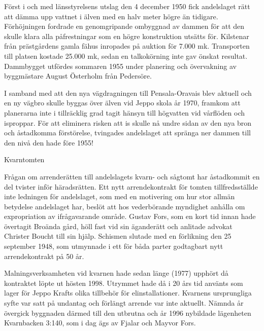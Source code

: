 Först i och med länsstyrelsens utslag den 4 december 1950 fick andelslaget rätt att dämma upp vattnet i älven med en halv meter högre än tidigare. Förhöjningen fordrade en genomgripande ombyggnad av dammen för att den skulle klara alla påfrestningar som en högre konstruktion utsätts för. Kilstenar från prästgårdens gamla fähus inropades på auktion för 7.000 mk. Transporten till platsen kostade 25.000 mk, sedan en talkokörning inte gav önskat resultat. Dammbygget utfördes sommaren 1955 under planering och övervakning av byggmästare August Österholm från Pedersöre.

I samband med att den nya vägdragningen till Pensala-Oravais blev aktuell och en ny vägbro skulle byggas över älven vid Jeppo skola år 1970,  framkom att planerarna inte i tillräcklig grad tagit hänsyn till högvatten vid vårflöden och isproppar. För att eliminera risken att is skulle nå undre sidan av den nya bron och åstadkomma förstörelse, tvingades andelslaget att spränga ner dammen till den nivå den hade före 1955!


Kvarntomten

Frågan om arrenderätten till andelslagets kvarn- och sågtomt har åstadkommit en del tvister inför häradsrätten. Ett nytt arrendekontrakt för tomten tillfredsställde inte ledningen för andelslaget, som med en motivering om hur stor allmän betydelse andelslaget har, beslöt att hos vederbörande myndighet anhålla om expropriation av ifrågavarande område. Gustav Fors, som en kort tid innan hade övertagit Broända gård, höll fast vid sin äganderätt och anlitade advokat Christer Boucht till sin hjälp. Schismen slutade med en förlikning den 25 september 1948, som utmynnade i ett för båda parter godtagbart nytt arrendekontrakt på 50 år.

Malningsverksamheten vid kvarnen hade sedan länge (1977) upphört då kontraktet löpte ut hösten 1998. Utrymmet hade då i 20 års tid använts som lager för Jeppo Krafts olika tillbehör för elinstallationer. Kvarnens ursprungliga syfte var satt på undantag och förlängt arrende var inte aktuellt. Nämnda år övergick byggnaden därmed till den utbrutna och år 1996 nybildade lägenheten Kvarnbacken 3:140, som i dag ägs av Fjalar och Mayvor Fors.

